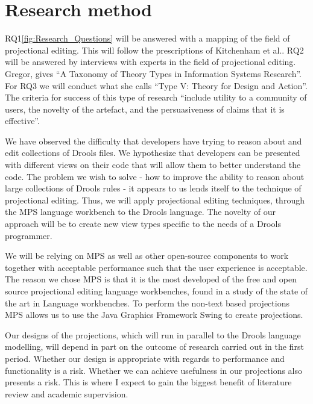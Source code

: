 \section{Research method} 

RQ1\ref{fig:Research_Questions} will be answered with a mapping of the field of projectional editing. 
This will follow the prescriptions of Kitchenham et al.\cite{kitchenham2015evidence}.
RQ2 will be answered by interviews with experts in the field of projectional editing.
Gregor\cite{gregor2006nature}, gives “A Taxonomy of Theory Types in Information Systems Research”. 
For RQ3 we will conduct what she calls “Type V: Theory for Design and Action”. 
The criteria for success of this type of research “include utility to a community of users, the novelty of the artefact, and the persuasiveness of claims that it is effective”.

We have observed the difficulty that developers have trying to reason about and edit collections of Drools files.
We hypothesize that developers can be presented with different views on their code that will allow them to better understand the code.
The problem we wish to solve - how to improve the ability to reason about large collections of Drools rules - it appears to us lends itself to the technique of projectional editing.
Thus, we will apply projectional editing techniques, through the MPS language workbench to the Drools language.
The novelty of our approach will be to create new view types specific to the needs of a Drools programmer.

We will be relying on MPS as well as other open-source components to work together with acceptable performance such that the user experience is acceptable.
The reason we chose MPS is that it is the most developed of the free and open source projectional editing language workbenches, found in a study of the state of the art in Language workbenches\cite{erdweg2013state}.
To perform the non-text based projections MPS allows us to use the Java Graphics Framework Swing to create projections.

Our designs of the projections, which will run in parallel to the Drools language modelling, will depend in part on the outcome of research carried out in the first period.
Whether our design is appropriate with regards to performance and functionality is a risk. 
Whether we can achieve usefulness in our projections also presents a risk.
This is where I expect to gain the biggest benefit of literature review and academic supervision. 

